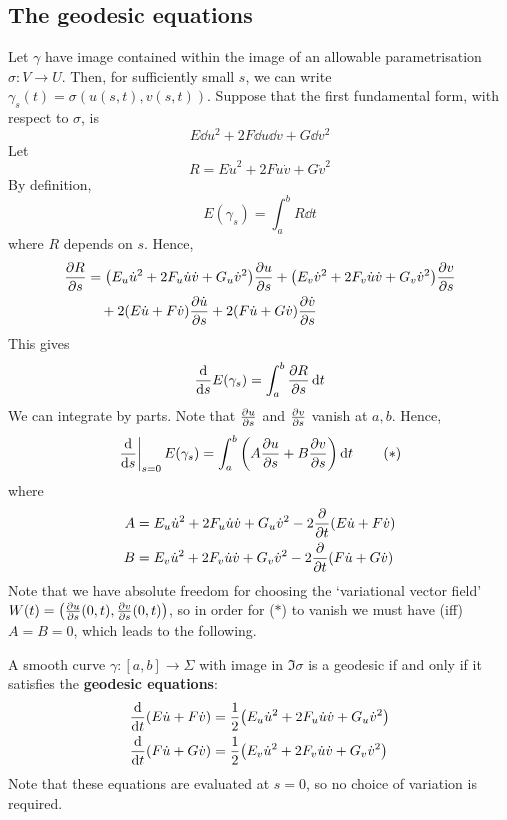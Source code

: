 \documentclass[a4paper,11pt]{article}
\begin{document}
\subsection{The geodesic equations}
Let \( \gamma \) have image contained within the image of an allowable parametrisation \( \sigma \colon V \to U \).
Then, for sufficiently small \( s \), we can write \( \gamma_s(t) = \sigma(u(s,t), v(s,t)) \).
Suppose that the first fundamental form, with respect to \( \sigma \), is
\[
	E \dd{u}^2 + 2F \dd{u} \dd{v} + G \dd{v}^2
\]
Let
\[
	R = E \dot u^2 + 2F \dot u \dot v + G \dot v^2
\]
By definition,
\[
	E(\gamma_s) = \int_a^b R \dd{t}
\]
where \( R \) depends on \( s \).
Hence,
\begin{align*}
	\pdv{R}{s} & = \qty(E_u \dot u^2 + 2F_u \dot u \dot v + G_u \dot v^2) \pdv{u}{s} + \qty(E_v \dot v^2 + 2F_v \dot u \dot v + G_v \dot v^2) \pdv{v}{s} \\
	           & \quad + 2 (E \dot u + F \dot v) \pdv{\dot u}{s} + 2(F \dot u + G \dot v) \pdv{\dot v}{s}
\end{align*}
This gives
\[
	\dv{s} E(\gamma_s) = \int_a^b \pdv{R}{s} \dd{t}
\]
We can integrate by parts.
Note that \( \pdv{u}{s} \) and \( \pdv{v}{s} \) vanish at \( a,b \).
Hence,
\[
	\eval{\dv{s}}_{s=0} E(\gamma_s) = \int_a^b \qty(A \pdv{u}{s} + B \pdv{v}{s}) \dd{t} \tag{$*$}
\]
where
\begin{align*}
	A & = E_u \dot u^2 + 2F_u \dot u \dot v + G_u \dot v^2 - 2 \pdv{t} \qty(E \dot u + F \dot v) \\
	B & = E_v \dot u^2 + 2F_v \dot u \dot v + G_v \dot v^2 - 2 \pdv{t} \qty(F \dot u + G \dot v)
\end{align*}
Note that we have absolute freedom for choosing the `variational vector field' $ W(t) = \qty( \pdv{u}{s} \qty(0,t), \pdv{v}{s} \qty(0,t) ) $, so in order for ($*$) to vanish we must have (iff) $A=B=0$, which leads to the following.
\begin{corollary}
	A smooth curve \( \gamma \colon [a,b] \to \Sigma \) with image in \( \Im \sigma \) is a geodesic if and only if it satisfies the \textbf{geodesic equations}:
	\begin{align*}
		\dv{t} \qty(E \dot u + F \dot v) & = \frac{1}{2} \qty( E_u \dot u^2 + 2F_u \dot u \dot v + G_u \dot v^2 ) \\
		\dv{t} \qty(F \dot u + G \dot v) & = \frac{1}{2} \qty( E_v \dot u^2 + 2F_v \dot u \dot v + G_v \dot v^2 )
	\end{align*}
	Note that these equations are evaluated at \( s = 0 \), so no choice of variation is required.
\end{corollary}
\end{document}
